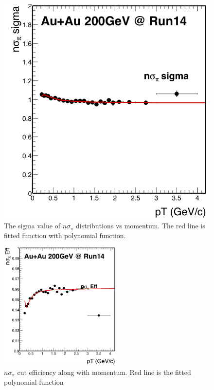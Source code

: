 \documentclass[a4paper]{article}
\begin{document}
\begin{figure}[htbp]
\begin{minipage}[htbp]{0.5\linewidth}
\centering
\includegraphics[width=1.0\textwidth]{fig/nSigPion_sigma.png}
\caption{The sigma value of $n\sigma_{\pi}$ distributions vs momentum. The red line is fitted function with polynomial function. \label{fig:pionsigma}}
\end{minipage}
\end{figure}

\begin{figure}[htbp]
\centering
\includegraphics[keepaspectratio,width=0.55\textwidth]{fig/nSigPion_Eff.png}
\caption{$n\sigma_{\pi}$ cut efficiency along with momentum. Red line is the fitted polynomial function}
\label{fig:pionnsigmaeff}
\end{figure}
\end{document}

